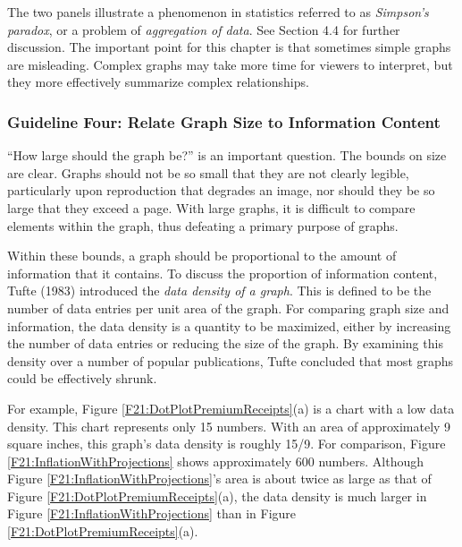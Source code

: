 The two panels illustrate a phenomenon in statistics referred to as
\emph{Simpson's paradox}, or a problem of \emph{aggregation of
data}. See Section 4.4 for further discussion. The important point
for this chapter is that sometimes simple graphs are misleading.
Complex graphs may take more time for viewers to interpret, but they
more effectively summarize complex relationships.

\linejed

\subsubsection*{Guideline Four: Relate Graph Size to Information Content}

``How large should the graph be?'' is an important question. The
bounds on size are clear. Graphs should not be so small that they
are not clearly legible, particularly upon reproduction that
degrades an image, nor should they be so large that they exceed a
page. With large graphs, it is difficult to compare elements within
the graph, thus defeating a primary purpose of graphs.


Within these bounds, a graph should be proportional to the amount of
information that it contains. To discuss the proportion of
information content, Tufte (1983) introduced the \emph{data density
of a graph}. This is defined to be the number of data entries per
unit area of the graph. For comparing graph size and information,
the data density is a quantity to be maximized, either by increasing
the number of data entries or reducing the size of the graph. By
examining this density over a number of popular publications, Tufte
concluded that most graphs could be effectively shrunk.

For example, Figure \ref{F21:DotPlotPremiumReceipts}(a) is a chart
with a low data density. This chart represents only 15 numbers. With
an area of approximately 9 square inches, this graph's data density
is roughly 15/9. For comparison, Figure
\ref{F21:InflationWithProjections} shows approximately 600 numbers.
Although Figure \ref{F21:InflationWithProjections}'s area is about
twice as large as that of Figure
\ref{F21:DotPlotPremiumReceipts}(a), the data density is much larger
in Figure \ref{F21:InflationWithProjections} than in Figure
\ref{F21:DotPlotPremiumReceipts}(a).


